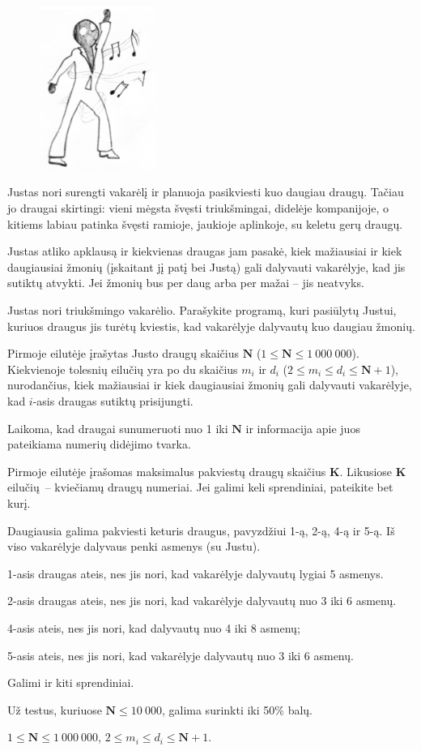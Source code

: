 \documentclass{liostyle}
\newcommand{\maxN}{1\ 000\ 000}
\begin{document}
\begin{figure}
\vspace{-20pt}
\includegraphics[width=3.8cm]{draugai_fig1}
\vspace{-20pt}
\end{figure}

Justas nori surengti vakarėlį ir planuoja pasikviesti kuo 
daugiau draugų. Tačiau jo draugai skirtingi: vieni mėgsta 
švęsti triukšmingai, didelėje kompanijoje, o kitiems labiau 
patinka švęsti ramioje, jaukioje aplinkoje, su keletu gerų 
draugų.


Justas atliko apklausą ir kiekvienas draugas jam pasakė, kiek 
mažiausiai ir kiek daugiausiai žmonių (įskaitant jį patį bei 
Justą) gali dalyvauti vakarėlyje, kad jis sutiktų atvykti. Jei
žmonių bus per daug arba per mažai – jis neatvyks.

\Task
Justas nori triukšmingo vakarėlio. Parašykite programą, kuri pasiūlytų 
Justui, kuriuos draugus jis turėtų kviestis, kad vakarėlyje dalyvautų kuo daugiau 
žmonių.

\Input
Pirmoje eilutėje įrašytas Justo draugų skaičius $\mathbf{N}$
($1 \le \mathbf{N} \le \maxN$). Kiekvienoje tolesnių eilučių yra po du skaičius
$m_i$ ir $d_i$ ($2\le m_i\le d_i\le \mathbf{N}+1$), nurodančius, kiek
mažiausiai ir kiek daugiausiai žmonių gali dalyvauti vakarėlyje, kad $i$-asis
draugas sutiktų prisijungti.

Laikoma, kad draugai sunumeruoti nuo 1 iki $\mathbf{N}$ ir informacija apie
juos pateikiama numerių didėjimo tvarka.

\Output
Pirmoje eilutėje įrašomas maksimalus pakviestų draugų skaičius $\mathbf{K}$.
Likusiose $\mathbf{K}$ eilučių~-- kviečiamų draugų numeriai. Jei galimi keli sprendiniai,
pateikite bet kurį.

\Examples
\example
{}
{}
{
Daugiausia galima pakviesti keturis draugus,
pavyzdžiui 1-ą, 2-ą, 4-ą ir 5-ą. Iš
viso vakarėlyje dalyvaus penki asmenys (su
Justu).

1-asis draugas ateis, nes jis nori, kad
vakarėlyje dalyvautų lygiai 5 asmenys. 

2-asis draugas ateis, nes jis nori, kad
vakarėlyje dalyvautų nuo 3 iki 6 asmenų. 

4-asis ateis, nes jis nori, kad dalyvautų nuo
4 iki 8 asmenų;

5-asis ateis, nes jis nori, kad vakarėlyje
dalyvautų nuo 3 iki 6 asmenų.

Galimi ir kiti sprendiniai.
}

\Grading
Už testus, kuriuose $\mathbf{N} \le 10\ 000$, galima surinkti iki 50\% balų.

\Constraints
$1 \le \mathbf{N} \le \maxN$,\enskip
$2\le m_i\le d_i\le \mathbf{N}+1$.
\end{document}
